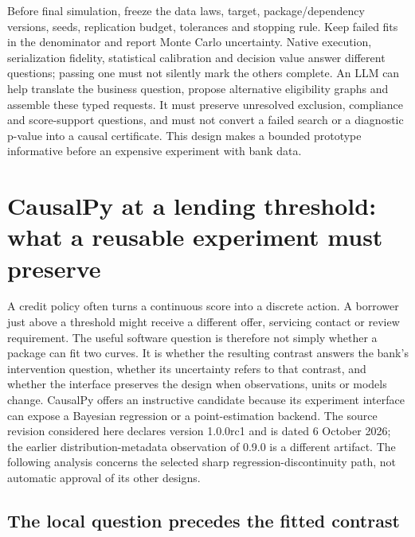 Before final simulation, freeze the data laws, target, package/dependency versions,
seeds, replication budget, tolerances and stopping rule. Keep failed fits in the
denominator and report Monte Carlo uncertainty. Native execution, serialization
fidelity, statistical calibration and decision value answer different questions;
passing one must not silently mark the others complete. An LLM can help translate
the business question, propose alternative eligibility graphs and assemble these
typed requests. It must preserve unresolved exclusion, compliance and score-support
questions, and must not convert a failed search or a diagnostic p-value into a
causal certificate. This design makes a bounded prototype informative before
an expensive experiment with bank data.


\section{CausalPy at a lending threshold: what a reusable experiment must preserve}
\label{exec14:causalpy-contract}

A credit policy often turns a continuous score into a discrete action. A borrower
just above a threshold might receive a different offer, servicing contact or
review requirement. The useful software question is therefore not simply whether
a package can fit two curves. It is whether the resulting contrast answers the
bank's intervention question, whether its uncertainty refers to that contrast,
and whether the interface preserves the design when observations, units or models
change. CausalPy offers an instructive candidate because its experiment interface
can expose a Bayesian regression or a point-estimation backend. The source
revision considered here declares version 1.0.0rc1 and is dated 6 October 2026;
the earlier distribution-metadata observation of 0.9.0 is a different artifact.
The following analysis concerns the selected sharp regression-discontinuity
path, not automatic approval of its other designs.~\citep{exec14_causalpy_primary}

\subsection{The local question precedes the fitted contrast}

